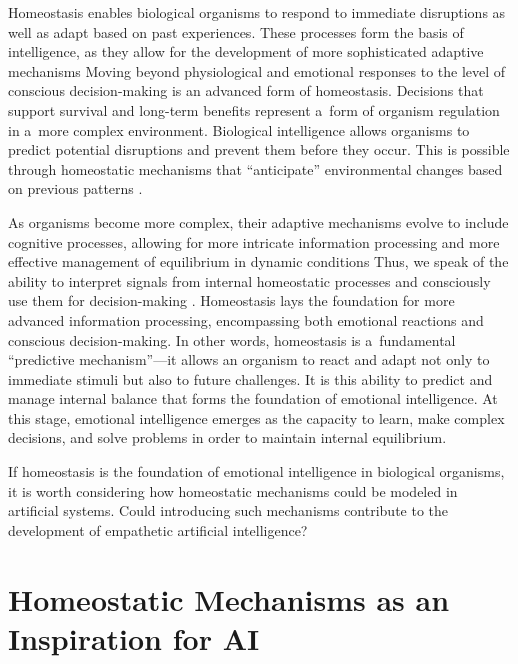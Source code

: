 \documentclass[%
  manuscript=article,
  year=2024,
  volume=77,
  doi=10.59203/zfn.77.706,
]{zfn}
\begin{document}
Homeostasis enables biological organisms to respond to immediate disruptions as well as adapt based on past experiences. These processes form the basis of intelligence, as they allow for the development of more sophisticated adaptive mechanisms 
\parencite[][]{torday_cell_2015} %
 Moving beyond physiological and emotional responses to the level of conscious decision-making is an advanced form of homeostasis. Decisions that support survival and long-term benefits represent a~form of organism regulation in a~more complex environment. Biological intelligence allows organisms to predict potential disruptions and prevent them before they occur. This is possible through homeostatic mechanisms that ``anticipate'' environmental changes based on previous patterns 
\parencite[][]{eskov_evolution_2017}.%
~



As organisms become more complex, their adaptive mechanisms evolve to include cognitive processes, allowing for more intricate information processing and more effective management of equilibrium in dynamic conditions 
\parencite[][]{davies_adaptive_2016} %
 Thus, we speak of the ability to interpret signals from internal homeostatic processes and consciously use them for decision-making 
\parencite[][]{billman_homeostasis_2013}. %
 Homeostasis lays the foundation for more advanced information processing, encompassing both emotional reactions and conscious decision-making. In other words, homeostasis is a~fundamental ``predictive mechanism''---it allows an organism to react and adapt not only to immediate stimuli but also to future challenges. It is this ability to predict and manage internal balance that forms the foundation of emotional intelligence. At this stage, emotional intelligence emerges as the capacity to learn, make complex decisions, and solve problems in order to maintain internal equilibrium.



If homeostasis is the foundation of emotional intelligence in biological organisms, it is worth considering how homeostatic mechanisms could be modeled in artificial systems. Could introducing such mechanisms contribute to the development of empathetic artificial intelligence?



\section*{Homeostatic Mechanisms as an Inspiration for AI}
\end{document}
